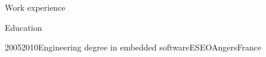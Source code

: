 \documentclass[a4paper, 10pt]{article}
\begin{document}
\begin{section} {Work experience}

\end{section}

\begin{unbreakableSection} {Education}
    \begin{education}{2005}{2010}{Engineering degree in embedded software}{ESEO}{Angers}{France}
    \end{education}
\end{unbreakableSection}
\end{document}
